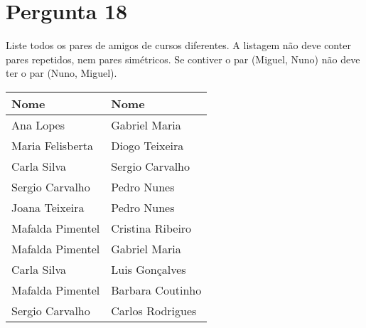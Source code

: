 {\section{Pergunta 18}
Liste todos os pares de amigos de cursos diferentes. A listagem não deve conter pares repetidos, nem pares simétricos. Se contiver o par (Miguel, Nuno) não deve ter o par (Nuno, Miguel).
\begin{center} \begin{tabular}{l l}
    \textbf{Nome}    & \textbf{Nome}    \\ \hline
    Ana Lopes        & Gabriel Maria    \\
    Maria Felisberta & Diogo Teixeira   \\
    Carla Silva      & Sergio Carvalho  \\
    Sergio Carvalho  & Pedro Nunes      \\
    Joana Teixeira   & Pedro Nunes      \\
    Mafalda Pimentel & Cristina Ribeiro \\
    Mafalda Pimentel & Gabriel Maria    \\
    Carla Silva      & Luis Gonçalves   \\
    Mafalda Pimentel & Barbara Coutinho \\
    Sergio Carvalho  & Carlos Rodrigues
\end{tabular} \end{center}


}

